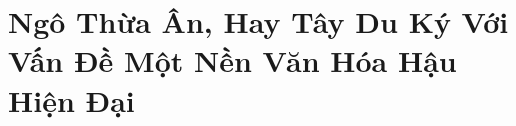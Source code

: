 \part{Ngô Thừa Ân, Hay Tây Du Ký Với Vấn Đề Một Nền Văn Hóa Hậu Hiện Đại} %
\label{prt:ngo_thua_an_voi_van_de_nen_van_hoa_hau_hien_dai}

\afterpage{\blankpage}
\addtocounter{page}{+1}
